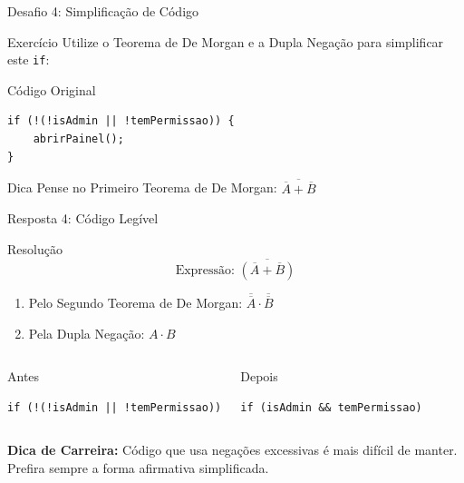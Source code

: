 \documentclass[9pt]{beamer}
\begin{document}
\begin{frame}[fragile]{Desafio 4: Simplificação de Código}

\begin{block}{Exercício}
Utilize o Teorema de De Morgan e a Dupla Negação para simplificar este \texttt{if}:
\end{block}

\begin{alertblock}{Código Original}
\begin{verbatim}
if (!(!isAdmin || !temPermissao)) {
    abrirPainel();
}
\end{verbatim}
\end{alertblock}

\begin{block}{Dica}
Pense no Primeiro Teorema de De Morgan: $\overline{\overline{A} + \overline{B}}$
\end{block}

\end{frame}

\begin{frame}[fragile]{Resposta 4: Código Legível}

\begin{block}{Resolução}
\[ \text{Expressão: } \overline{(\overline{A} + \overline{B})} \]
\begin{enumerate}
    \item Pelo Segundo Teorema de De Morgan: $\overline{\overline{A}} \cdot \overline{\overline{B}}$
    \item Pela Dupla Negação: $A \cdot B$
\end{enumerate}
\end{block}

\begin{columns}

\begin{alertblock}{Antes}
\begin{verbatim}
if (!(!isAdmin || !temPermissao))
\end{verbatim}
\end{alertblock}

\begin{block}{Depois}
\begin{verbatim}
if (isAdmin && temPermissao)
\end{verbatim}
\end{block}

\end{columns}

\vspace{0.4cm}
\textcolor{structure}{\textbf{Dica de Carreira:} Código que usa negações excessivas é mais difícil de manter. Prefira sempre a forma afirmativa simplificada.}

\end{frame}
\end{document}
